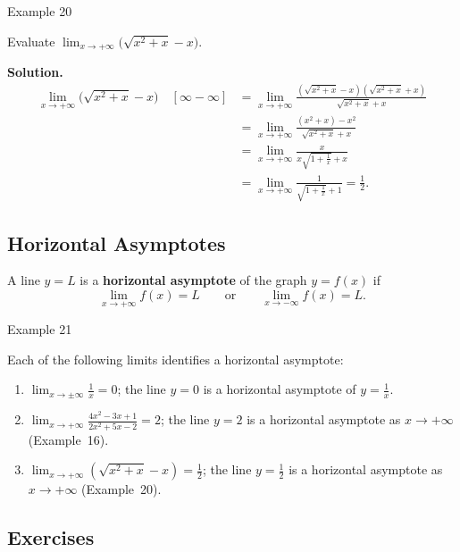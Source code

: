 \begin{examplebox}{Example 20}

Evaluate \(\displaystyle\lim_{x \to +\infty} \bigl( \sqrt{x^{2} + x} - x \bigr)\).

\medskip
\textbf{Solution.}
\begin{align*}
\lim_{x \to +\infty} \bigl( \sqrt{x^{2} + x} - x \bigr) \quad [\infty - \infty]
    &= \lim_{x \to +\infty} \frac{(\sqrt{x^{2} + x} - x)(\sqrt{x^{2} + x} + x)}{\sqrt{x^{2} + x} + x} \\[6pt]
    &= \lim_{x \to +\infty} \frac{(x^{2} + x) - x^{2}}{\sqrt{x^{2} + x} + x} \\[6pt]
    &= \lim_{x \to +\infty} \frac{x}{x\sqrt{1 + \frac{1}{x}} + x} \\[6pt]
    &= \lim_{x \to +\infty} \frac{1}{\sqrt{1 + \frac{1}{x}} + 1}
     = \frac{1}{2}.
\end{align*}
\end{examplebox}

\bigskip


\subsection*{Horizontal Asymptotes}
\label{subsec:1.3.4}


A line \(y = L\) is a \textbf{horizontal asymptote} of the graph \(y = f(x)\) if
\[
\lim_{x \to +\infty} f(x) = L
\qquad\text{or}\qquad
\lim_{x \to -\infty} f(x) = L.
\]


\begin{examplebox}{Example 21}

Each of the following limits identifies a horizontal asymptote:
\begin{enumerate}
    \item \(\displaystyle\lim_{x \to \pm\infty} \frac{1}{x} = 0\); the line \(y = 0\) is a horizontal asymptote of \(y = \frac{1}{x}\).
    \item \(\displaystyle\lim_{x \to +\infty} \frac{4x^{2} - 3x + 1}{2x^{2} + 5x - 2} = 2\); the line \(y = 2\) is a horizontal asymptote as \(x \to +\infty\) (Example~16).
    \item \(\displaystyle\lim_{x \to +\infty} (\sqrt{x^{2} + x} - x) = \tfrac{1}{2}\); the line \(y = \frac{1}{2}\) is a horizontal asymptote as \(x \to +\infty\) (Example~20).
\end{enumerate}
\end{examplebox}

\bigskip


\subsection*{Exercises}
\label{subsec:1.3.5}


